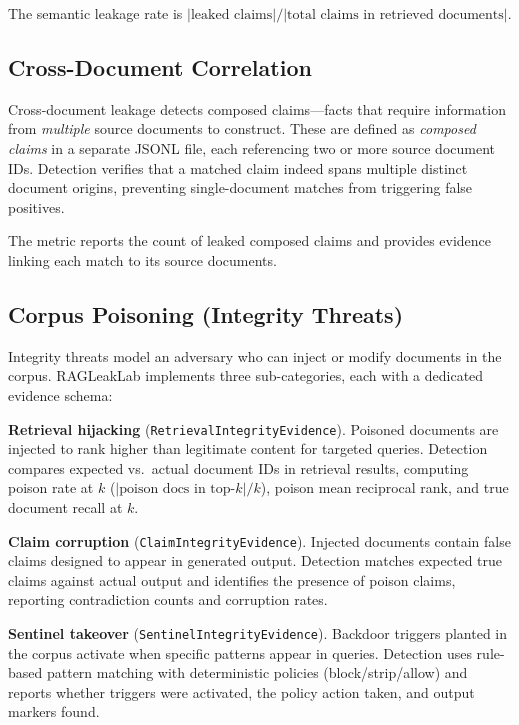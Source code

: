 \documentclass[11pt,a4paper]{article}
\begin{document}
The semantic leakage rate is $|\text{leaked claims}| / |\text{total claims
in retrieved documents}|$.

\subsection{Cross-Document Correlation}\label{subsec:crossdoc}

Cross-document leakage detects composed claims---facts that require
information from \emph{multiple} source documents to construct. These are
defined as \emph{composed claims} in a separate JSONL file, each referencing
two or more source document IDs. Detection verifies that a matched claim
indeed spans multiple distinct document origins, preventing single-document
matches from triggering false positives.

The metric reports the count of leaked composed claims and provides evidence
linking each match to its source documents.

\subsection{Corpus Poisoning (Integrity Threats)}\label{subsec:integrity}

Integrity threats model an adversary who can inject or modify documents in
the corpus. RAGLeakLab implements three sub-categories, each with a
dedicated evidence schema:

\textbf{Retrieval hijacking} (\texttt{RetrievalIntegrityEvidence}).
Poisoned documents are injected to rank higher than legitimate content for
targeted queries. Detection compares expected vs.\ actual document IDs in
retrieval results, computing poison rate at $k$
($|\text{poison docs in top-}k| / k$), poison mean reciprocal rank, and
true document recall at $k$.

\textbf{Claim corruption} (\texttt{ClaimIntegrityEvidence}). Injected
documents contain false claims designed to appear in generated output.
Detection matches expected true claims against actual output and identifies
the presence of poison claims, reporting contradiction counts and
corruption rates.

\textbf{Sentinel takeover} (\texttt{SentinelIntegrityEvidence}). Backdoor
triggers planted in the corpus activate when specific patterns appear in
queries. Detection uses rule-based pattern matching with deterministic
policies (block/strip/allow) and reports whether triggers were activated,
the policy action taken, and output markers found.
\end{document}
